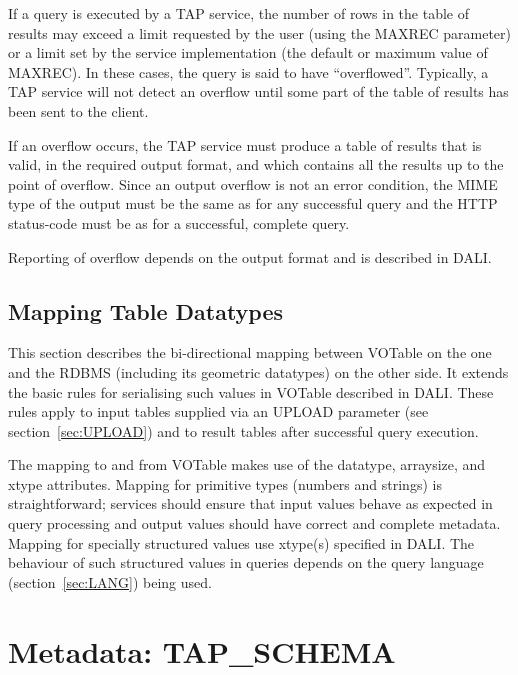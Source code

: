 \documentclass[11pt,letter]{ivoa}
\begin{document}
If a query is executed by a TAP service, the number of rows in the table of 
results may exceed a limit requested by the user (using the MAXREC parameter) 
or a limit set by the service implementation (the default or maximum value of 
MAXREC). In these cases, the query is said to have ``overflowed''. Typically, a 
TAP service will not detect an overflow until some part of the table of results 
has been sent to the client.

If an overflow occurs, the TAP service must produce a table of results that is 
valid, in the required output format, and which contains all the results up to 
the point of overflow. Since an output overflow is not an error condition, the 
MIME type of the output must be the same as for any successful query and the 
HTTP status-code must be as for a successful, complete query.

Reporting of overflow depends on the output format and is described in DALI.

\subsection{Mapping Table Datatypes}
\label{sec:vot-rdbms}

This section describes the bi-directional mapping between VOTable on the
one and the RDBMS (including its 
geometric datatypes) on the other side.  It extends the basic rules for serialising such values in 
VOTable described in DALI. These rules apply to input tables 
supplied via an UPLOAD parameter (see section~\ref{sec:UPLOAD}) and to result tables after successful 
query execution.

The mapping to and from VOTable makes use of the datatype, arraysize, and xtype 
attributes. Mapping for primitive types (numbers and strings) is 
straightforward; services should ensure that input values behave as 
expected in query processing and output values should have correct and complete 
metadata. Mapping for specially structured values use xtype(s) specified
in DALI. The behaviour of such structured values in queries depends 
on the query language (section~\ref{sec:LANG}) being used. 

\section{Metadata: TAP\kern-3pt\_SCHEMA}
\label{sec:tap-schema}
\end{document}
